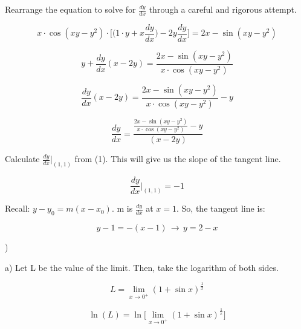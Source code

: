 \documentclass{article}
\begin{document}
\noindent Rearrange the equation to solve for $\frac{dy}{dx}$ through a careful and rigorous attempt.

\begin{equation*} x\cdot\cos(xy-y^2) \cdot \Big[\Big(1\cdot y + x\frac{dy}{dx} \Big) -2y\frac{dy}{dx}\Big]= 2x - \sin(xy-y^2)\end{equation*}

\begin{equation*} y + \frac{dy}{dx}(x-2y)= \frac{2x - \sin(xy-y^2)}{x\cdot\cos(xy-y^2)}\end{equation*}

\begin{equation*} \frac{dy}{dx}(x-2y)= \frac{2x - \sin(xy-y^2)}{x\cdot\cos(xy-y^2)} - y\end{equation*}

\hfill

\begin{equation} \frac{dy}{dx} = \frac{\frac{2x - \sin(xy-y^2)}{x\cdot\cos(xy-y^2)} - y}{(x-2y)}\end{equation}

\hfill

\noindent Calculate $\displaystyle \frac{dy}{dx}\Bigg|_{(1,1)}$ from (1). This will give us the slope of the tangent line.

\begin{equation*}\frac{dy}{dx}\Bigg|_{(1,1)} = -1\end{equation*}

\hfill

\noindent Recall: $y-y_0 = m(x-x_0)$. m is $\displaystyle \frac{dy}{dx}$ at $x=1$. So, the tangent line is:

\begin{equation*} y-1 = -(x-1) \,\rightarrow\, \boxed{y=2-x}\end{equation*}

\hfill

)

\hfill

\noindent a) Let L be the value of the limit. Then, take the logarithm of both sides.

\begin{equation*}L = \lim_{x\to 0^+} (1+\sin x)^{\frac{1}{x}}\end{equation*}

\begin{equation*}\ln(L) = \ln\Big[\lim_{x\to 0^+} (1+\sin x)^{\frac{1}{x}}\Big]\end{equation*}
\end{document}
